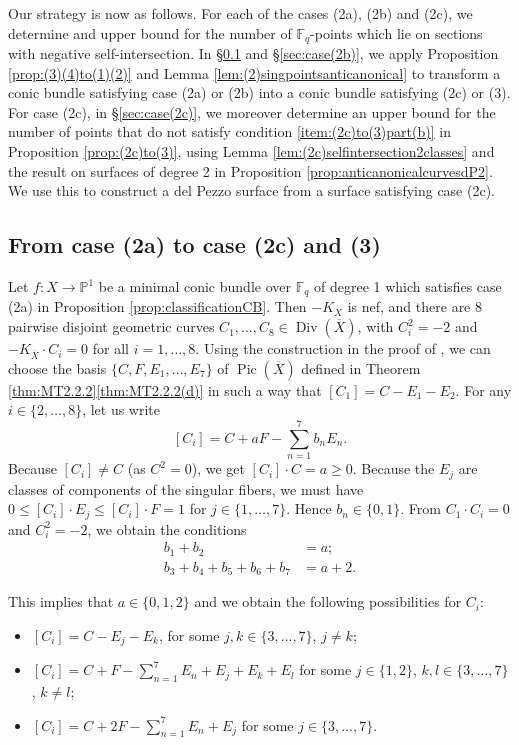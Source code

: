 \documentclass[a4paper, 11pt, reqno]{amsart}
\numberwithin{equation}{section} \numberwithin{figure}{section}
\DeclareMathOperator{\Pic}{Pic}
\DeclareMathOperator{\Div}{Div}
\def \F {{\mathbb F}}
\def \P {{\mathbb P}}
\newcommand{\ra}{\rightarrow}
\theoremstyle{definition}
\numberwithin{lemma}{section}
\begin{document}
Our strategy is now as follows. For each of the cases (2a), (2b) and (2c), we determine and upper bound for the number of $\F_q$-points which lie on sections with negative self-intersection. In \S\ref{sec:case(2a)} and \S\ref{sec:case(2b)}, we apply Proposition \ref{prop:(3)(4)to(1)(2)} and Lemma \ref{lem:(2)singpointsanticanonical} to transform a conic bundle satisfying case (2a) or (2b) into a conic bundle satisfying (2c) or (3). For case (2c), in \S\ref{sec:case(2c)}, we moreover determine an upper bound for the number of points that do not satisfy condition \ref{item:(2c)to(3)part(b)} in Proposition \ref{prop:(2c)to(3)}, using Lemma \ref{lem:(2c)selfintersection2classes} and the result on surfaces of degree 2 in Proposition \ref{prop:anticanonicalcurvesdP2}. We use this to construct a del Pezzo surface from a surface satisfying case (2c).  

\subsection{From case (2a) to case (2c) and (3)}\label{sec:case(2a)}
Let $f \colon X \ra \P^1 $ be a minimal conic bundle over $\F_q$ of degree 1 which satisfies case (2a) in Proposition \ref{prop:classificationCB}. Then $-K_X$ is nef, and there are 8 pairwise disjoint geometric curves $C_1, \ldots, C_8 \in \Div(\overline{X})$, with $C_i^2 = -2$ and $-K_{\overline{X}} \cdot C_i = 0$ for all $i = 1, \ldots, 8$. Using the construction in the proof of \cite[Proposition 2.6]{trepalindeg2}, we can choose the basis $\{C, F, E_1, \ldots, E_7\}$ of $\Pic(\overline{X})$ defined in Theorem \ref{thm:MT2.2.2}\ref{thm:MT2.2.2(d)} in such a way that $[C_1] = C - E_1 - E_2$. For any $i \in \{2, \ldots, 8\}$,  let us write \[[C_i] = C + aF - \sum_{n=1}^7 b_n E_n.\] Because $[C_i] \neq C$ (as $C^2 = 0$), we get $[C_i] \cdot C = a \geq 0$. Because the $E_j$ are classes of components of the singular fibers, we must have $0 \leq [C_i] \cdot E_j \leq [C_i] \cdot F = 1$ for $j \in \{1, \ldots, 7\}$. Hence $b_n \in \{0, 1\}$. From $C_1 \cdot C_i = 0$ and $C_i^2 = -2$, we obtain the conditions 
\begin{align*}
    b_1 + b_2 &= a;\\
    b_3 + b_4 + b_5 + b_6 + b_7 &= a + 2.
\end{align*}

This implies that $a \in \{0, 1, 2\}$ and we obtain the following possibilities for $C_i$:
\begin{itemize}
    \item $[C_i] = C - E_j - E_k$, for some $j, k \in \{3, \ldots, 7\}$, $j \neq k$; 
    \item $[C_i] = C + F - \sum_{n=1}^7 E_n + E_j + E_k + E_l$ for some $j \in \{1, 2\}$, $k, l \in \{3, \ldots, 7\}$, $k \neq l$;
    \item $[C_i] = C + 2F - \sum_{n=1}^7 E_n + E_j$ for some $j \in \{3, \ldots, 7\}$.
\end{itemize}
\end{document}

